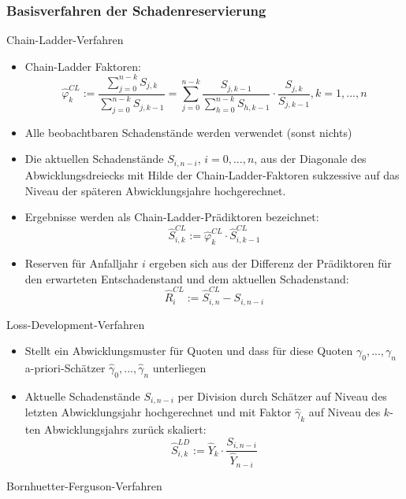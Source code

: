 \documentclass[12pt]{report}
\theoremstyle{dotless}
\theoremstyle{definition}
\begin{document}
\subsubsection{Basisverfahren der Schadenreservierung}

Chain-Ladder-Verfahren
\begin{itemize}
\item Chain-Ladder Faktoren:
\begin{equation}
\hat{\varphi}_k^{CL} := \frac{\sum_{j=0}^{n-k} S_{j,k}}{\sum_{j=0}^{n-k} S_{j,k-1}}= \sum_{j=0}^{n-k} \frac{S_{j,k-1}}{\sum_{h=0}^{n-k} S_{h,k-1}} \cdot \frac{S_{j,k}}{S_{j,k-1}}, k=1,...,n
\end{equation}
\item Alle beobachtbaren Schadenstände werden verwendet (sonst nichts)
\item Die aktuellen Schadenstände $S_{i,n-i}$, $i=0,...,n$, aus der Diagonale des Abwicklungsdreiecks mit Hilde der Chain-Ladder-Faktoren sukzessive auf das Niveau der späteren Abwicklungsjahre hochgerechnet.
\item Ergebnisse werden als Chain-Ladder-Prädiktoren bezeichnet:
\begin{equation}
\hat{S}_{i,k}^{CL}:= \hat{\varphi}_k^{CL} \cdot \hat{S}_{i,k-1}^{CL}
\end{equation}
\item Reserven für Anfalljahr $i$ ergeben sich aus der Differenz der Prädiktoren für den erwarteten Entschadenstand und dem aktuellen Schadenstand:
\begin{equation}
\hat{R}_i^{CL}:= \hat{S}_{i,n}^{CL} - S_{i,n-i}
\end{equation}
\end{itemize}
Loss-Development-Verfahren
\begin{itemize}
\item Stellt ein Abwicklungsmuster für Quoten und dass für diese Quoten $\gamma_0, ...,\gamma_n$ a-priori-Schätzer $\hat{\gamma}_0, ..., \hat{\gamma}_n$ unterliegen 
\item Aktuelle Schadenstände $S_{i, n-i}$ per Division durch Schätzer auf Niveau des letzten Abwicklungsjahr hochgerechnet und mit Faktor $\hat{\gamma}_k$ auf Niveau des $k$-ten Abwicklungsjahrs zurück skaliert:
\begin{equation}
\hat{S}_{i,k}^{LD} := \hat{Y}_k \cdot \frac{S_{i,n-i}}{\hat{Y}_{n-i}}
\end{equation}
\end{itemize}
Bornhuetter-Ferguson-Verfahren
\end{document}
